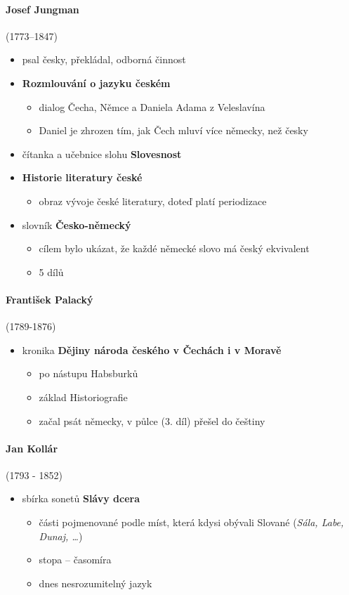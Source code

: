 \paragraph{Josef Jungman} (1773--1847)
\begin{itemize}
\item psal česky, překládal, odborná činnost
\item \textbf{Rozmlouvání o jazyku českém}
	\begin{itemize}
	\item dialog Čecha, Němce a Daniela Adama z Veleslavína
	\item Daniel je zhrozen tím, jak Čech mluví více německy, než česky
	\end{itemize}
\item čítanka a učebnice slohu \textbf{Slovesnost}
\item \textbf{Historie literatury české}
	\begin{itemize}
	\item obraz vývoje české literatury, doteď platí periodizace	
	\end{itemize}
\item slovník \textbf{Česko-německý}
	\begin{itemize}
	\item cílem bylo ukázat, že každé německé slovo má český ekvivalent
	\item 5 dílů
	\end{itemize}
\end{itemize}

\paragraph{František Palacký} (1789-1876)
\begin{itemize}
\item kronika \textbf{Dějiny národa českého v Čechách i v Moravě}
	\begin{itemize}
	\item po nástupu Habsburků
	\item základ Historiografie
	\item začal psát německy, v půlce (3. díl) přešel do češtiny
	\end{itemize}
\end{itemize}

\paragraph{Jan Kollár}(1793 - 1852)
\begin{itemize}
\item sbírka sonetů \textbf{Slávy dcera}
	\begin{itemize}
	\item části pojmenované podle míst, která kdysi obývali Slované (\textit{Sála, Labe, Dunaj, \ldots})
	\item stopa -- časomíra
	\item dnes nesrozumitelný jazyk
	\end{itemize}
\end{itemize}

